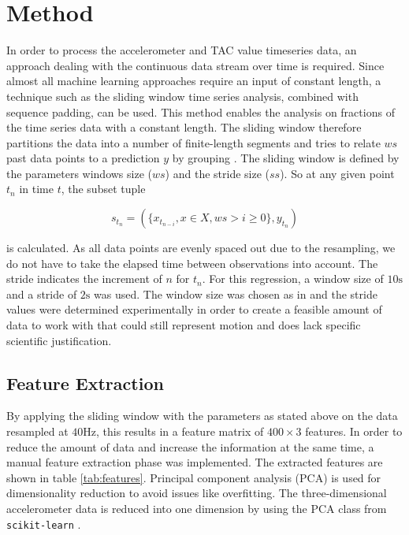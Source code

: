 \section{Method}\label{sec:method}
In order to process the accelerometer and TAC value timeseries data, an approach dealing with the continuous data stream over time is required.
Since almost all machine learning approaches require an input of constant length, a technique such as the sliding window time series analysis, combined with sequence padding, can be used.
This method enables the analysis on fractions of the time series data with a constant length.
The sliding window therefore partitions the data into a number of finite-length segments and tries to relate $ws$ past data points to a prediction $y$ by grouping \cite{MOZAFFARI2015150}.
The sliding window is defined by the parameters windows size ($ws$) and the stride size ($ss$).
So at any given point $t_n$ in time $t$, the subset tuple 

\begin{equation}
	s_{t_n} = (\{ x_{t_{n - i}}, x \in X, ws > i \geq 0 \}, y_{t_n})
\end{equation}

is calculated.
As all data points are evenly spaced out due to the resampling, we do not have to take the elapsed time between observations into account.
The stride indicates the increment of $n$ for $t_n$.
For this regression, a window size of $10\si{\second}$ and a stride of $2\si{\second}$ was used.
The window size was chosen as in \cite{DBLP:conf/ijcai/KillianPNMC19} and the stride values were determined experimentally in order to create a feasible amount of data to work with that could still represent motion and does lack specific scientific justification.
















\subsection{Feature Extraction}\label{ssec:feature}
By applying the sliding window with the parameters as stated above on the data resampled at $40 \si{\hertz}$, this results in a feature matrix of $400 \times 3$ features. In order to reduce the amount of data and increase the information at the same time, a manual feature extraction phase was implemented.
The extracted features are shown in table \ref{tab:features}. Principal component analysis (PCA) is used for dimensionality reduction to avoid issues like overfitting. The three-dimensional accelerometer data is reduced into one dimension by using the PCA class from  \texttt{scikit-learn} \cite{scikit-learn}.

